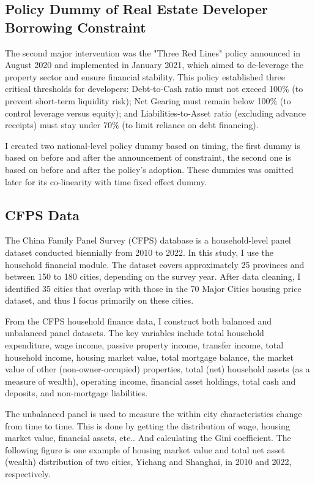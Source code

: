 \documentclass[12pt,english]{article}
\begin{document}
	\subsection{Policy Dummy of Real Estate Developer Borrowing Constraint}
	The second major intervention was the "Three Red Lines" policy announced in August 2020 and implemented in January 2021, which aimed to de-leverage the property sector and ensure financial stability. This policy established three critical thresholds for developers: Debt-to-Cash ratio must not exceed 100\% (to prevent short-term liquidity risk); Net Gearing must remain below 100\% (to control leverage versus equity); and Liabilities-to-Asset ratio (excluding advance receipts) must stay under 70\% (to limit reliance on debt financing).
	
	I created two national-level policy dummy based on timing, the first dummy is based on before and after the announcement of constraint, the second one is based on before and after the policy's adoption. These dummies was omitted later for its co-linearity with time fixed effect dummy.
	
	\subsection{CFPS Data}
	The China Family Panel Survey (CFPS) database is a household-level panel dataset conducted biennially from 2010 to 2022. In this study, I use the household financial module. The dataset covers approximately 25 provinces and between 150 to 180 cities, depending on the survey year. After data cleaning, I identified 35 cities that overlap with those in the 70 Major Cities housing price dataset, and thus I focus primarily on these cities.
	
	From the CFPS household finance data, I construct both balanced and unbalanced panel datasets. The key variables include total household expenditure, wage income, passive property income, transfer income, total household income, housing market value, total mortgage balance, the market value of other (non-owner-occupied) properties, total (net) household assets (as a measure of wealth), operating income, financial asset holdings, total cash and deposits, and non-mortgage liabilities.
	
	The unbalanced panel is used to measure the within city characteristics change from time to time. This is done by getting the distribution of wage, housing market value, financial assets, etc.. And calculating the Gini coefficient. The following figure is one example of housing market value and total net asset (wealth) distribution of two cities, Yichang and Shanghai, in 2010 and 2022, respectively.
	
\end{document}
